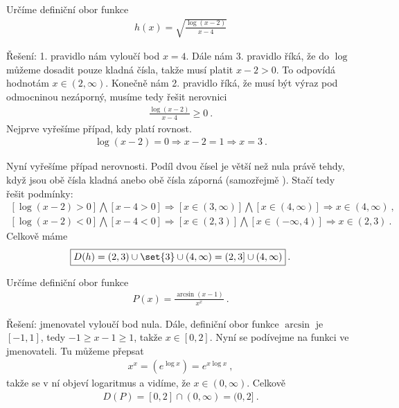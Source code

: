 \begin{example}
    Určíme definiční obor funkce \begin{align}
        h(x) = \sqrt{ \frac{\log (x-2)}{x-4}}
    \end{align}

    Řešení: 1. pravidlo nám vyloučí bod $x=4$. 
    Dále nám 3. pravidlo říká, že do $\log$ můžeme dosadit pouze kladná čísla, takže musí platit $x-2>0$. To odpovídá hodnotám $x \in (2, \infty)$. 
    Konečně nám 2. pravidlo říká, že musí být výraz pod odmocninou nezáporný, musíme tedy řešit nerovnici \begin{align}
        \frac{\log (x-2)}{x-4} \geq 0 \:.
    \end{align}
    Nejprve vyřešíme případ, kdy platí rovnost.
    \begin{align}
        \log (x-2) = 0 \Longrightarrow x-2 = 1 \Longrightarrow x = 3 \:.
    \end{align}
    
    Nyní vyřešíme případ nerovnosti. Podíl dvou čísel je větší než nula právě tehdy, když jsou obě čísla kladná anebo obě čísla záporná (samozřejmě ). Stačí tedy řešit podmínky:
    \begin{align*}
        \left [\log (x-2) > 0 \right] \bigwedge \left[ x-4 > 0\right] \Longrightarrow [x \in (3,\infty)] \bigwedge [x \in (4, \infty)] \Longrightarrow x \in (4, \infty) \:, \\
        \left [\log (x-2) < 0 \right] \bigwedge \left[ x-4 < 0\right] \Longrightarrow [x \in (2,3)] \bigwedge [x \in (-\infty, 4)] \Longrightarrow x \in (2,3) \:.
    \end{align*}
    Celkově máme \begin{align*}
        \boxed{ D(h) = (2,3) \cup \set{3} \cup (4,\infty) = (2,3] \cup (4,\infty) } \:.
    \end{align*}
\end{example}

\begin{example}
    Určíme definiční obor funkce \begin{align}
        P(x) = \frac{\arcsin (x-1)}{x^x} \:.
    \end{align}

    Řešení: jmenovatel vyloučí bod nula. Dále, definiční obor funkce $\arcsin$ je $[-1,1]$, tedy $ -1 \geq x-1 \geq 1$, takže $x \in [0,2]$. 
    Nyní se podívejme na funkci ve jmenovateli. Tu můžeme přepsat \begin{align}
        x^x = \left( e^{\log x} \right) = e^{x \log x} \:,
    \end{align}
    takže se v ní objeví logaritmus a vidíme, že $x \in (0, \infty)$.
    Celkově \begin{align}
        \boxed{ D(P) = [0,2] \cap (0, \infty) = (0,2] } \:.
    \end{align}

\end{example}

